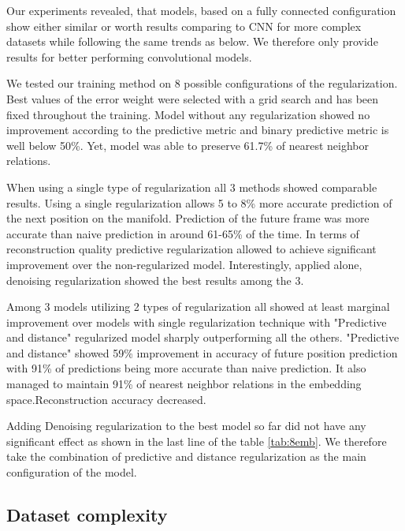 Our experiments revealed, that models, based on a fully connected configuration show either similar or worth results comparing to CNN for more complex datasets while following the same trends as below. We therefore only provide results for better performing convolutional models.

We tested our training method on 8 possible configurations of the regularization. Best values of the error weight were selected with a grid search and has been fixed throughout the training. Model without any regularization showed
no improvement according to the predictive metric and binary predictive metric is well below 50\%. Yet, model was able to preserve 61.7\% of nearest neighbor relations.

When using a single type of regularization all 3 methods showed comparable results. Using a single regularization allows 5 to 8\% more accurate prediction of the next position on the manifold. Prediction of the future frame was more accurate than naive prediction in around 61-65\% of the time. In terms of reconstruction quality predictive regularization allowed to achieve significant improvement over the non-regularized model. Interestingly, applied alone, denoising regularization showed the best results among the 3.

Among 3 models utilizing 2 types of regularization all showed at least marginal improvement over models with single regularization technique with "Predictive and distance" regularized model sharply outperforming all the others. "Predictive and distance" showed 59\% improvement in accuracy of future position prediction with 91\% of predictions being more accurate than naive prediction. It also managed to maintain 91\% of nearest neighbor relations in the embedding space.Reconstruction accuracy decreased.

Adding Denoising regularization to the best model so far did not have any significant effect as shown in the last line of the table \ref{tab:8emb}. We therefore take the combination of predictive and distance regularization as the main configuration of the model.


\subsection{Dataset complexity}

